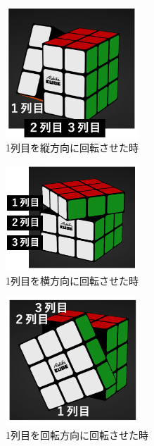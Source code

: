 \documentclass[a4j,titlepage]{jsarticle}
\begin{document}
\begin{figure}[htb]
  \centering
  \includegraphics[width=5cm]{./tex_pic/tate.jpg}
  \caption{1列目を縦方向に回転させた時}
  \label{fig:tate}
\end{figure}
\begin{figure}[htb]
  \centering
  \includegraphics[width=5cm]{./tex_pic/yoko.jpg}
  \caption{1列目を横方向に回転させた時}
  \label{fig:yoko}
\end{figure}
\begin{figure}[htb]
  \centering
  \includegraphics[width=5cm]{./tex_pic/kai.jpg}
  \caption{1列目を回転方向に回転させた時}
  \label{fig:kai}
\end{figure}
\end{document}
